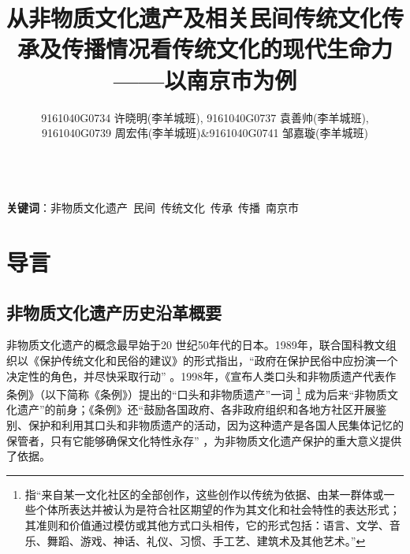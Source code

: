 \documentclass[12pt]{article}%
\title{从非物质文化遗产及相关民间传统文化传承及传播情况看传统文化的现代生命力——以南京市为例}
\author{9161040G0734 许晓明(李羊城班), 9161040G0737 袁善帅(李羊城班),\\9161040G0739 周宏伟(李羊城班)\&9161040G0741 邹嘉璇(李羊城班)}
\date{}
\begin{document}

\renewcommand{\contentsname}{\centering 目录}
\renewcommand{\tablename}{表}
\renewcommand{\figurename}{图}
\renewcommand\refname{参考文献}
\renewcommand\appendix{\setcounter{secnumdepth}{0}}
\renewcommand\abstractname{摘要}



\maketitle

\\

\textbf{关键词}：非物质文化遗产\ 民间\ 传统文化\ 传承\ 传播\ 南京市

\tableofcontents

\section{导言}

\subsection{非物质文化遗产历史沿革概要}

非物质文化遗产的概念最早始于20 世纪50年代的日本。1989年，联合国科教文组织以《保护传统文化和民俗的建议》的形式指出，“政府在保护民俗中应扮演一个决定性的角色，并尽快采取行动”
。1998年，《宣布人类口头和非物质遗产代表作条例》（以下简称《条例》）提出的“口头和非物质遗产”一词
\footnote{指“来自某一文化社区的全部创作，这些创作以传统为依据、由某一群体或一些个体所表达并被认为是符合社区期望的作为其文化和社会特性的表达形式；其准则和价值通过模仿或其他方式口头相传，它的形式包括：语言、文学、音乐、舞蹈、游戏、神话、礼仪、习惯、手工艺、建筑术及其他艺术。”}
成为后来“非物质文化遗产”的前身；《条例》还“鼓励各国政府、各非政府组织和各地方社区开展鉴别、保护和利用其口头和非物质遗产的活动，因为这种遗产是各国人民集体记忆的保管者，只有它能够确保文化特性永存”
，为非物质文化遗产保护的重大意义提供了依据。
\end{document}
